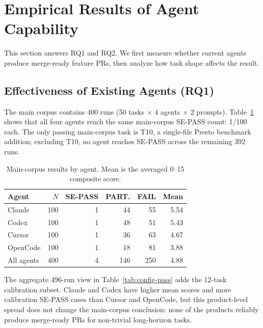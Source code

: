 \section{Empirical Results of Agent Capability}
\label{sec:results}

This section answers RQ1 and RQ2. We first measure whether current agents produce merge-ready feature PRs, then analyze how task shape affects the result.

\subsection{Effectiveness of Existing Agents (RQ1)}
\label{sec:results-main}

The main corpus contains 400 runs (50 tasks $\times$ 4 agents $\times$ 2 prompts). Table~\ref{tab:main-agent} shows that all four agents reach the same main-corpus SE-PASS count: 1/100 each. The only passing main-corpus task is T10, a single-file Presto benchmark addition; excluding T10, no agent reaches SE-PASS across the remaining 392 runs.

\begin{table}[t]
\caption{Main-corpus results by agent. Mean is the averaged 0--15 composite score.}
\label{tab:main-agent}
\centering
\small
\begin{tabular*}{\columnwidth}{@{\extracolsep{\fill}}lrrrrr@{}}
\toprule
\textbf{Agent} & $N$ & \textbf{SE-PASS} & \textbf{PART.} & \textbf{FAIL} & \textbf{Mean} \\
\midrule
Claude  & 100 & 1 & 44 & 55 & 5.54 \\
Codex   & 100 & 1 & 48 & 51 & 5.43 \\
Cursor  & 100 & 1 & 36 & 63 & 4.67 \\
OpenCode & 100 & 1 & 18 & 81 & 3.88 \\
\midrule
All agents & 400 & 4 & 146 & 250 & 4.88 \\
\bottomrule
\end{tabular*}
\end{table}

The aggregate 496-run view in Table~\ref{tab:config-pass} adds the 12-task calibration subset. Claude and Codex have higher mean scores and more calibration SE-PASS cases than Cursor and OpenCode, but this product-level spread does not change the main-corpus conclusion: none of the products reliably produce merge-ready PRs for non-trivial long-horizon tasks.

